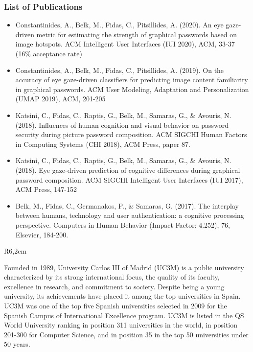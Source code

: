 \documentclass[a4paper,11pt]{article}
\begin{document}
\subsubsection*{List of Publications}

\begin{itemize}
\item Constantinides, A., Belk, M., Fidas, C., Pitsillides, A. (2020). An eye gaze-driven metric for estimating the strength of graphical passwords based on image hotspots. ACM Intelligent User Interfaces (IUI 2020), ACM, 33-37 (16\% acceptance rate)
\item Constantinides, A., Belk, M., Fidas, C., Pitsillides, A. (2019). On the accuracy of eye gaze-driven classifiers for predicting image content familiarity in graphical passwords. ACM User Modeling, Adaptation and Personalization (UMAP 2019), ACM, 201-205
\item Katsini, C., Fidas, C., Raptis, G., Belk, M., Samaras, G., \& Avouris, N. (2018). Influences of human cognition and visual behavior on password security during picture password composition. ACM SIGCHI Human Factors in Computing Systems (CHI 2018), ACM Press, paper 87.
\item Katsini, C., Fidas, C., Raptis, G., Belk, M., Samaras, G., \& Avouris, N. (2018). Eye gaze-driven prediction of cognitive differences during graphical password composition. ACM SIGCHI Intelligent User Interfaces (IUI 2017), ACM Press, 147-152
\item Belk, M., Fidas, C., Germanakos, P., \& Samaras, G. (2017). The interplay between humans, technology and user authentication: a cognitive processing perspective. Computers in Human Behavior (Impact Factor: 4.252), 76, Elsevier, 184-200.


\end{itemize}


\begin{wrapfigure}{R}{6,2cm}
\vspace{-3cm}
\hfill {}
\vspace{-1cm}
\end{wrapfigure}
\vspace{10pt}

Founded in 1989, University Carlos III of Madrid (UC3M) is a public university characterized by its strong
international focus, the quality of its faculty, excellence in research, and commitment to society. Despite being
a young university, its achievements have placed it among the top universities in Spain. UC3M was one of
the top five Spanish universities selected in 2009 for the Spanish Campus of International Excellence program.
UC3M
is listed in the QS World University ranking in position 311 universities in the world, in position 201-300 for
Computer Science, and in position 35 in the top 50 universities under 50 years. 
\end{document}
